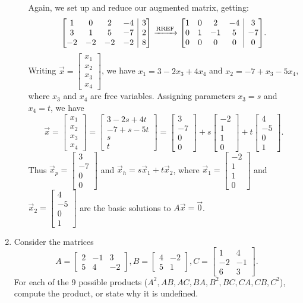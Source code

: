 \documentclass[12pt]{article}
\makeatletter
\newenvironment{amatrix}[1]{%
  \left[\begin{array}{@{}*{#1}{c}|c@{}}
}{%
  \end{array}\right]
}
\newcommand{\bbm}{\begin{bmatrix}}
\newcommand{\ebm}{\end{bmatrix}}
\newcommand{\bam}{\begin{amatrix}}
\newcommand{\eam}{\end{amatrix}}
\makeatother
\begin{document}
\begin{enumerate}
\begin{enumerate}
Again, we set up and reduce our augmented matrix, getting:
\[
\bam{4}
1&0&2&-4&3\\3&1&5&-7&2\\-2&-2&-2&-2&8\eam \xrightarrow{\text{RREF}} 
\bam{4}1&0&2&-4&3\\0&1&-1&5&-7\\0&0&0&0&0\eam.
\]
Writing $\vec{x}=\bbm x_1\\x_2\\x_3\\x_4\ebm$, we have $x_1 = 3-2x_3+4x_4$ and $x_2=-7+x_3-5x_4$, where $x_3$ and $x_4$ are free variables. Assigning parameters $x_3=s$ and $x_4=t$, we have
\[
\vec{x} = \bbm x_1\\x_2\\x_3\\x_4\ebm = \bbm 3-2s+4t\\-7+s-5t\\s\\t\ebm = \bbm 3\\-7\\0\\0\ebm+s\bbm -2\\1\\1\\0\ebm+t\bbm 4\\-5\\0\\1\ebm.
\]
Thus $\vec{x}_p = \bbm 3\\-7\\0\\0\ebm$ and $\vec{x}_h = s\vec{x}_1+t\vec{x}_2$, where $\vec{x}_1 = \bbm -2\\1\\1\\0\ebm$ and $\vec{x}_2 = \bbm 4\\-5\\0\\1\ebm$ are the basic solutions to $A\vec{x}=\vec{0}$.
\end{enumerate}


\item Consider the matrices
\[
A = \bbm 2&-1&3\\5&4&-2\ebm, B = \bbm 4&-2\\5&1\ebm, C = \bbm 1&4\\-2&-1\\6&3\ebm.
\]
For each of the 9 possible products ($A^2, AB, AC, BA, B^2, BC, CA, CB, C^2$), compute the product, or state why it is undefined.


\end{enumerate}
\end{document}
